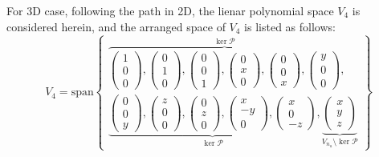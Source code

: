For 3D case, following the path in 2D, the lienar polynomial space $V_4$ is considered herein,
and the arranged space of $V_4$ is listed as follows:
\begin{equation}
    V_4 = \mathrm{span} 
    \begin{Bmatrix}
        \overbrace{
            \begin{pmatrix} 1 \\ 0 \\ 0 \end{pmatrix},
            \begin{pmatrix} 0 \\ 1 \\ 0 \end{pmatrix},
            \begin{pmatrix} 0 \\ 0 \\ 1 \end{pmatrix},
            \begin{pmatrix} 0 \\ x \\ 0 \end{pmatrix},
            \begin{pmatrix} 0 \\ 0 \\ x \end{pmatrix},
            \begin{pmatrix} y \\ 0 \\ 0 \end{pmatrix}
        }^{\ker \mathcal P},
            \\
        \underbrace{
            \begin{pmatrix} 0 \\ 0 \\ y \end{pmatrix},
            \begin{pmatrix} z \\ 0 \\ 0 \end{pmatrix},
            \begin{pmatrix} 0 \\ z \\ 0 \end{pmatrix},
            \begin{pmatrix} x \\-y \\ 0 \end{pmatrix},
            \begin{pmatrix} x \\ 0 \\-z \end{pmatrix}
        }_{\ker \mathcal P}, 
        \underbrace{
            \begin{pmatrix} x \\ y \\ z \end{pmatrix}
        }_{V_{n_u}\setminus \ker \mathcal P}
    \end{Bmatrix}
\end{equation}

